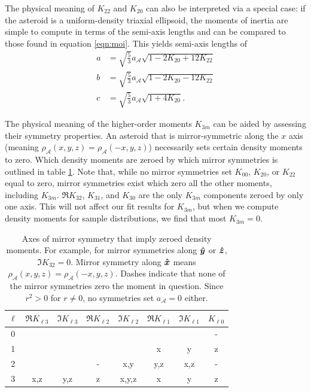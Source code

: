 The physical meaning of $K_{22}$ and $K_{20}$ can also be interpreted via a special case: if the asteroid is a uniform-density triaxial ellipsoid, the moments of inertia are simple to compute in terms of the semi-axis lengths and can be compared to those found in equation \ref{eqn:moi}. This yields semi-axis lengths of 
\begin{equation}
  \begin{split}
  a &= \sqrt{\frac{5}{3}}a_\mathcal{A}\sqrt{1-2K_{20}+12K_{22}}\\
  b &= \sqrt{\frac{5}{3}}a_\mathcal{A}\sqrt{1-2K_{20}-12K_{22}}\\
  c &= \sqrt{\frac{5}{3}}a_\mathcal{A}\sqrt{1+4K_{20}}.
  \label{eqn:ellipsoid-axes}
  \end{split}
\end{equation}

The physical meaning of the higher-order moments $K_{3m}$ can be aided by assessing their symmetry properties. An asteroid that is mirror-symmetric along the $\unit{x}$ axis (meaning $\rho_\mathcal{A}(x,y,z)=\rho_\mathcal{A}(-x,y,z)$) necessarily sets certain density moments to zero. Which density moments are zeroed by which mirror symmetries is outlined in table \ref{tab:klm-symmetries}. Note that, while no mirror symmetries set $K_{00}$, $K_{20}$, or $K_{22}$ equal to zero, mirror symmetries exist which zero all the other moments, including $K_{3m}$. $\Re K_{32}$, $K_{31}$, and $K_{30}$ are the only $K_{3m}$ components zeroed by only one axis. This will not affect our fit results for $K_{3m}$, but when we compute density moments for sample distributions, we find that most $K_{3m}=0$.

\begin{table}
  \centering
  \begin{tabular}{c|ccccccc}
    \hline
    $\ell$ & $\Re K_{\ell 3}$ & $\Im K_{\ell 3}$ & $\Re K_{\ell 2}$ & $\Im K_{\ell 2}$ & $\Re K_{\ell 1}$ & $\Im K_{\ell 1}$ & $K_{\ell 0}$ \\ \hline
    0 &  &  &  &  &  &  & -\\ 
    1 &  &  &  &  & x & y & z\\ 
    2 &  &  & - & x,y & y,z & x,z & -\\ 
    3 & x,z & y,z & z & x,y,z & x & y & z\\ \hline
  \end{tabular}
  \caption{Axes of mirror symmetry that imply zeroed density moments. For example, for mirror symmetries along $\bm{\hat{y}}$ or $\bm{\hat{z}}$, $\Im K_{32}=0$. Mirror symmetry along $\bm{\hat{x}}$ means $\rho_\mathcal{A}(x, y, z) = \rho_\mathcal{A}(-x, y, z)$. Dashes indicate that none of the mirror symmetries zero the moment in question. Since $r^2>0$ for $r\neq 0$, no symmetries set $a_\mathcal{A}=0$ either.}
  \label{tab:klm-symmetries}
\end{table} 

